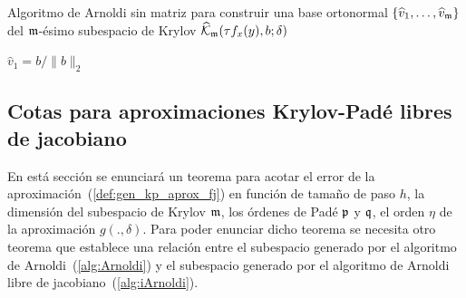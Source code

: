 {\SetAlgoNoLine
	\begin{algorithm}
		\caption{\cite{brown1987local} Algoritmo de Arnoldi sin matriz para construir una base ortonormal $\{\widehat{v}_1,\ldots,\widehat{v}_{\mathfrak{m}} \}$ 
			del $\mathfrak{m}$-ésimo subespacio de Krylov $\widehat{\mathcal{K}}_{\mathfrak{m}}(\tau f_x(y),b;\delta)$}
		\label{alg:iArnoldi}
		$\widehat{v}_1=b/\lVert b \rVert_2$\\
	\end{algorithm}
}

 \subsection{Cotas para aproximaciones Krylov-Padé libres de jacobiano}
  En está sección se enunciará un teorema para acotar el error de la aproximación~(\ref{def:gen_kp_aprox_fj}) en función de tamaño de paso $h$, la dimensión del subespacio de Krylov $\mathfrak{m}$, los órdenes de Padé $\mathfrak{p}$ y $\mathfrak{q}$, el orden $\eta$ de la aproximación $g(.,\delta)$. Para poder enunciar dicho teorema se necesita otro teorema que establece una relación entre el subespacio generado por el algoritmo de Arnoldi~(\ref{alg:Arnoldi}) y el subespacio generado por el algoritmo de Arnoldi libre de jacobiano~(\ref{alg:iArnoldi}).

